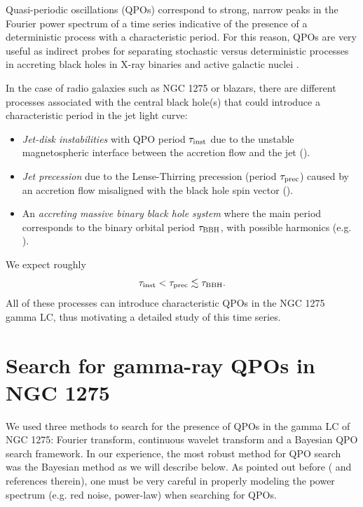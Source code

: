\documentclass{iau}
\begin{document}
Quasi-periodic oscillations (QPOs) correspond to strong, narrow peaks in the Fourier power spectrum of a time series indicative of the presence of a deterministic process with a characteristic period. For this reason, QPOs are very useful as indirect probes for separating stochastic versus deterministic processes in accreting black holes in X-ray binaries and active galactic nuclei \cite{Remillard2006, Gierlinski2008}. 

In the case of radio galaxies such as NGC 1275 or blazars, there are different processes associated with the central black hole(s) that could introduce a characteristic period in the jet light curve:
\begin{itemize}
\item \textit{Jet-disk instabilities} with QPO period $\tau_{\rm inst}$ due to the unstable magnetospheric interface between the accretion flow and the jet (\cite[McKinney, Blandford \& Tchekhovskoy 2012]{McKinney2012}).
\item \textit{Jet precession} due to the Lense-Thirring precession (period $\tau_{\rm prec}$) caused by an accretion flow misaligned with the black hole spin vector (\cite[Liska et al. 2018]{Liska2018}).
\item An \textit{accreting massive binary black hole system} where the main period corresponds to the binary orbital period $\tau_{\rm BBH}$, with possible harmonics (e.g. \cite[Roedig et al. 2012; Gold et al. 2014]{Roedig2012, Gold2014a}).
\end{itemize}
We expect roughly 
\begin{equation}
\tau_{\rm inst} < \tau_{\rm prec} \lesssim \tau_{\rm BBH}.
\end{equation} 
All of these processes can introduce characteristic QPOs in the NGC 1275 gamma LC, thus motivating a detailed study of this time series.  




\section{Search for gamma-ray QPOs in NGC 1275}

We used three methods to search for the presence of QPOs in the gamma LC of NGC 1275: Fourier transform, continuous wavelet transform and a Bayesian QPO search framework. In our experience, the most robust method for QPO search was the Bayesian method as we will describe below. As pointed out before (\cite[Vaughan et al. 2016]{Vaughan2016} and references therein), one must be very careful in properly modeling the power spectrum (e.g. red noise, power-law) when searching for QPOs. 
\end{document}
